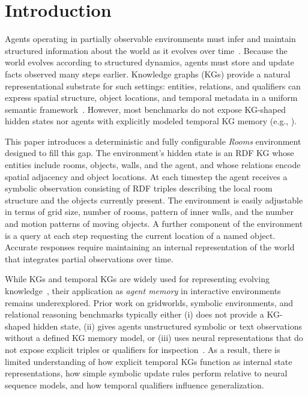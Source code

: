 \documentclass[runningheads]{llncs}
\begin{document}
\section{Introduction}

Agents operating in partially observable environments must infer and maintain structured information about the world as it evolves over time~\cite{KAELBLING199899}. Because the world evolves according to structured dynamics, agents must store and update facts observed many steps earlier. Knowledge graphs (KGs)
provide a natural representational substrate for such settings: entities,
relations, and qualifiers can express spatial structure, object
locations, and temporal metadata in a uniform semantic framework~\cite{ehrlinger2016towards,Hogan_2021,battaglia2018relationalinductivebiasesdeep,zambaldi2018relationaldeepreinforcementlearning}. However, most benchmarks do not expose KG-shaped hidden states nor agents with explicitly modeled temporal KG memory (e.g., \cite{battaglia2018relationalinductivebiasesdeep,zambaldi2018relationaldeepreinforcementlearning,Cote2018TextWorld,Hausknecht2020Jericho,Ammanabrolu2020Graph,Wayne2018MERLIN,graves2014neural,graves2016hybrid}).

This paper introduces a deterministic and fully configurable
\emph{Rooms} environment designed to fill this gap. The environment’s
hidden state is an RDF KG whose entities include rooms,
objects, walls, and the agent, and whose relations encode spatial
adjacency and object locations. At each timestep the agent receives a
symbolic observation consisting of RDF triples describing the local room
structure and the objects currently present. The environment is easily
adjustable in terms of grid size, number of rooms, pattern of inner
walls, and the number and motion patterns of moving objects. A further
component of the environment is a query at each step requesting the
current location of a named object. Accurate responses require
maintaining an internal representation of the world that integrates
partial observations over time.

While KGs and temporal KGs are widely used for representing evolving
knowledge~\cite{Hogan_2021,dellaglio2017streamreasoning,moreau2012prov,DBLP:journals/corr/abs-1809-03202},
their application as \emph{agent memory} in interactive environments
remains underexplored. Prior work on gridworlds, symbolic environments,
and relational reasoning benchmarks typically either (i) does not
provide a KG-shaped hidden state, (ii) gives agents unstructured
symbolic or text observations without a defined KG memory model, or
(iii) uses neural representations that do not expose explicit triples or
qualifiers for inspection~\cite{Cote2018TextWorld,Hausknecht2020Jericho,Ammanabrolu2020Graph,10.1609/aaai.v37i1.25075,battaglia2018relationalinductivebiasesdeep,zambaldi2018relationaldeepreinforcementlearning,graves2014neural,graves2016hybrid,Wayne2018MERLIN,DBLP:journals/corr/abs-1803-10122}.
 As a result, there is limited
understanding of how explicit temporal KGs function as internal state
representations, how simple symbolic update rules perform relative to
neural sequence models, and how temporal qualifiers influence
generalization.
\end{document}
